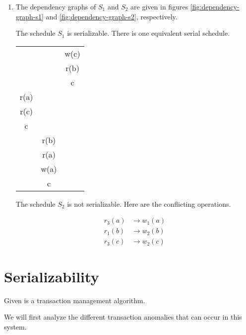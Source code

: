 \documentclass{article}
\begin{document}
\begin{enumerate}
    \item
        The dependency graphs of $S_1$ and $S_2$ are given in figures
        \ref{fig:dependency-graph-s1} and \ref{fig:dependency-graph-s2},
        respectively.

        The schedule $S_1$ is serializable. There is one equivalent serial
        schedule.

        \begin{center}
            \begin{tabular}{c | c | c}
                &      & w(c) \\
                &      & r(b) \\
                &      & c \\
                r(a) &      & \\
                r(c) &      & \\
                c    &      & \\
                     & r(b) & \\
                     & r(a) & \\
                     & w(a) & \\
                     & c    &
            \end{tabular}
        \end{center}

        The schedule $S_2$ is not serializable. Here are the conflicting
        operations.

        \begin{align*}
            r_3 (a) &\to w_1 (a) \\
            r_1 (b) &\to w_2 (b) \\
            r_3 (c) &\to w_2 (c)
        \end{align*}
\end{enumerate}

\section{Serializability}

Given is a transaction management algorithm.

We will first analyze the different transaction anomalies that can occur in
this system.
\end{document}
